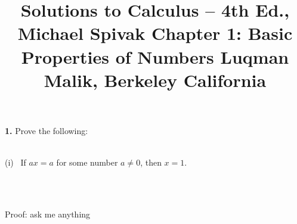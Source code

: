 \documentclass{article}
\begin{document}
\title{Solutions to Calculus -- 4th Ed., Michael Spivak
\linebreak 
\linebreak Chapter 1: Basic Properties of Numbers
\linebreak
\linebreak
\large{Luqman Malik, Berkeley California} 
\linebreak 
\linebreak}
\date{}
\maketitle

{\bf{1.}} Prove the following: 
\\
\\
\begin{indent}(i) \ If $ax=a$ for some number $a \neq 0$, then $x=1$.\end{indent}
\\
\\
\begin{indent}Proof: ask me anything\end{indent}
\end{document}

